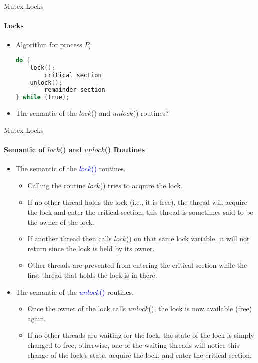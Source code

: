 \documentclass[10pt]{beamer}
\begin{document}
\begin{frame}[fragile]{Mutex Locks}
\framesubtitle{Locks}
\begin{itemize}
\item Algorithm for process $P_i$
\vspace{6pt}\\
\begin{lstlisting}[language=C]
do { 
	lock();
		critical section 
	unlock(); 
		remainder section 
} while (true); 
\end{lstlisting}
\item The semantic of the $lock$() and $unlock$() routines?
\end{itemize}
\end{frame}

\begin{frame}{Mutex Locks}
\framesubtitle{Semantic of $lock$() and $unlock$() Routines}
\begin{itemize}
 
\item The semantic of the \textcolor{blue}{$lock$()} routines.
\begin{itemize}
 
\item Calling the routine $lock$() tries to acquire the lock.
\item If no other thread holds the lock (i.e., it is free), the thread will acquire the lock and enter the critical section; this thread is sometimes said to be the owner of the lock.
\item If another thread then calls $lock$() on that same lock variable, it will not return since the lock is held by its owner.
\item Other threads are prevented from entering the critical section while the first thread that holds the lock is in there.
\end{itemize}
\item The semantic of the \textcolor{blue}{$unlock$()} routines.
\begin{itemize}
 
\item Once the owner of the lock calls $unlock$(), the lock is now available (free) again.
\item If no other threads are waiting for the lock, the state of the lock is simply changed to free; otherwise, one of the waiting threads will notice this change of the lock's state, acquire the lock, and enter the critical section.
\end{itemize}
\end{itemize}
\end{frame}
\end{document}
